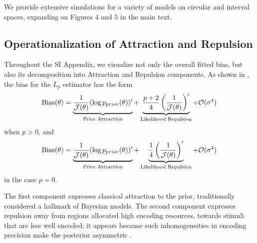 \documentclass[si.tex]{subfiles}
\begin{document}


We provide extensive simulations for a variety of models on circular and interval spaces, expanding on Figures 4 and 5 in the main text.

\subsection{Operationalization of Attraction and Repulsion}\label{sec:att-rep}

Throughout the SI Appendix, we visualize not only the overall fitted bias, but also its decomposition into Attraction and Repulsion components.
As shown in \cite{hahn2024unifying}, the bias for the $L_p$ estimator has the form
\begin{equation}\label{eq:ana-bias-att-rep}
    \text{Bias}(\theta) = \underbrace{\frac{1}{\mathcal{J}(\theta)} (\log p_{prior}(\theta))'}_{\text{Prior Attraction}} + \underbrace{\frac{p+2}{4} \left(\frac{1}{\mathcal{J}(\theta)}\right)'}_{\text{Likelihood Repulsion}} + \mathcal{O}(\sigma^4)
\end{equation}
when $p > 0$, and
\begin{equation}\label{eq:ana-bias-att-rep-0}
    \text{Bias}(\theta) = \underbrace{\frac{1}{\mathcal{J}(\theta)} (\log p_{prior}(\theta))'}_{\text{Prior Attraction}} + \underbrace{\frac{1}{4} \left(\frac{1}{\mathcal{J}(\theta)}\right)'}_{\text{Likelihood Repulsion}} + \mathcal{O}(\sigma^4)
\end{equation}
in the case $p=0$.

The first component expresses classical attraction  to the prior, traditionally considered a hallmark of Bayesian models.
The second component expresses repulsion away from regions allocated high encoding resources, towards stimuli that are less well encoded; it appears because such inhomogeneities in encoding precision make the posterior asymmetric \citep{Wei2012,Wei2015ABO,Wei2017LawfulRB,PratCarrabin2021BiasAV,hahn2024unifying}.
\end{document}
